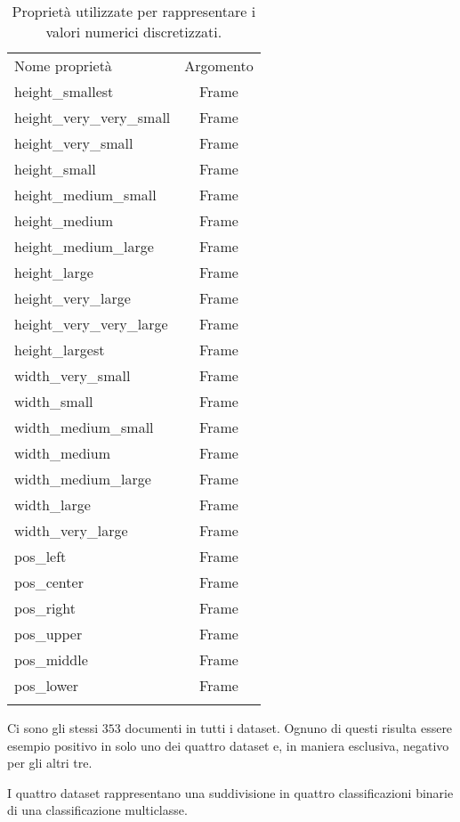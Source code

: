 \begin{table}[H]
\centering
\small\begin{tabular}{lc}
\toprule
\addlinespace
Nome proprietà & Argomento \\
\addlinespace
\midrule
\addlinespace
height\_smallest & Frame \\ 
height\_very\_very\_small & Frame \\ 
height\_very\_small & Frame \\ 
height\_small & Frame \\ 
height\_medium\_small & Frame \\ 
height\_medium & Frame \\ 
height\_medium\_large & Frame \\ 
height\_large & Frame \\ 
height\_very\_large & Frame \\ 
height\_very\_very\_large & Frame \\ 
height\_largest & Frame \\ 
\midrule
width\_very\_small & Frame \\ 
width\_small & Frame \\ 
width\_medium\_small & Frame \\ 
width\_medium & Frame \\ 
width\_medium\_large & Frame \\ 
width\_large & Frame \\ 
width\_very\_large & Frame \\ 
\midrule
pos\_left & Frame \\ 
pos\_center & Frame \\ 
pos\_right & Frame \\
\midrule
pos\_upper & Frame \\ 
pos\_middle & Frame \\ 
pos\_lower & Frame \\  
\addlinespace
\bottomrule 
\end{tabular}
\caption[Proprietà di discretizzazione]{Proprietà utilizzate per rappresentare i valori numerici discretizzati.}
\label{tab:discretizzazione}
\end{table}

Ci sono gli stessi $353$ documenti in tutti i dataset. Ognuno di questi risulta essere esempio positivo in solo uno dei quattro dataset e, in maniera esclusiva, negativo per gli altri tre.

I quattro dataset rappresentano una suddivisione in quattro classificazioni binarie di una classificazione multiclasse.


